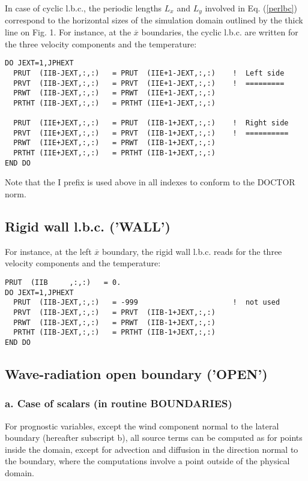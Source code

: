 In case of cyclic l.b.c., the periodic lengths $L_x$ and $L_y$ involved in
Eq. (\ref{perlbc}) correspond to the horizontal sizes of the simulation domain
outlined by the thick line on Fig. 1.
For instance, at the $\overline x$ boundaries, the cyclic l.b.c. are written
for the three velocity components and the temperature:
\begin{verbatim}
DO JEXT=1,JPHEXT
  PRUT  (IIB-JEXT,:,:)   = PRUT  (IIE+1-JEXT,:,:)    !  Left side
  PRVT  (IIB-JEXT,:,:)   = PRVT  (IIE+1-JEXT,:,:)    !  =========
  PRWT  (IIB-JEXT,:,:)   = PRWT  (IIE+1-JEXT,:,:)
  PRTHT (IIB-JEXT,:,:)   = PRTHT (IIE+1-JEXT,:,:)

  PRUT  (IIE+JEXT,:,:)   = PRUT  (IIB-1+JEXT,:,:)    !  Right side
  PRVT  (IIE+JEXT,:,:)   = PRVT  (IIB-1+JEXT,:,:)    !  ==========
  PRWT  (IIE+JEXT,:,:)   = PRWT  (IIB-1+JEXT,:,:)
  PRTHT (IIE+JEXT,:,:)   = PRTHT (IIB-1+JEXT,:,:)
END DO
\end{verbatim}

Note that the I prefix is used above in all indexes to conform to the DOCTOR
norm.

\subsection{Rigid wall l.b.c. ('WALL')}

For instance, at the left $\overline x$ boundary, the rigid wall l.b.c.
reads for the three velocity components and the temperature:
\begin{verbatim}
PRUT  (IIB     ,:,:)   = 0.
DO JEXT=1,JPHEXT
  PRUT  (IIB-JEXT,:,:)   = -999                      !  not used
  PRVT  (IIB-JEXT,:,:)   = PRVT  (IIB-1+JEXT,:,:)
  PRWT  (IIB-JEXT,:,:)   = PRWT  (IIB-1+JEXT,:,:)
  PRTHT (IIB-JEXT,:,:)   = PRTHT (IIB-1+JEXT,:,:)
END DO
\end{verbatim}

\subsection{Wave-radiation open boundary ('OPEN')}

\subsubsection{a. Case of scalars (in routine BOUNDARIES)}

For prognostic variables, except the wind component normal to the lateral
boundary (hereafter subscript b), all source terms can be computed as for
points inside the domain,
except for advection and diffusion in the direction normal to the
boundary, where the computations involve a point outside
of the physical domain.

